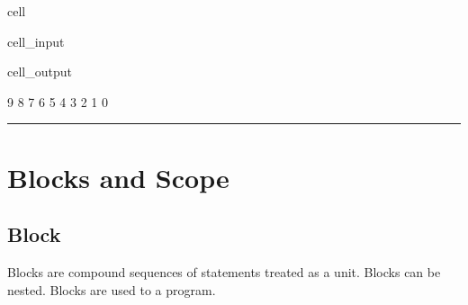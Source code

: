 \documentclass[a4paper,10pt,english]{jupyterBook}
\begin{document}
\begin{sphinxuseclass}{cell}\begin{sphinxVerbatimInput}

\begin{sphinxuseclass}{cell_input}
\begin{sphinxVerbatim}[commandchars=\\\{\}]
\end{sphinxVerbatim}

\end{sphinxuseclass}\end{sphinxVerbatimInput}
\begin{sphinxVerbatimOutput}

\begin{sphinxuseclass}{cell_output}
\begin{sphinxVerbatim}[commandchars=\\\{\}]
9 8 7 6 5 4 3 2 1 0 
\end{sphinxVerbatim}

\end{sphinxuseclass}\end{sphinxVerbatimOutput}

\end{sphinxuseclass}

\bigskip\hrule\bigskip


\sphinxstepscope


\section{Blocks and Scope}
\label{\detokenize{text/progtut/blocks:blocks-and-scope}}\label{\detokenize{text/progtut/blocks::doc}}

\subsection{Block}
\label{\detokenize{text/progtut/blocks:block}}
\sphinxAtStartPar
Blocks are compound sequences of statements treated as a unit.
Blocks can be nested. Blocks are used to  a program.
\end{document}
